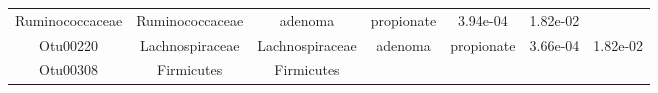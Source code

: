 \documentclass[11pt,]{article}
\begin{document}
\begin{longtable}[]{@{}ccccccc@{}}
\begin{minipage}[t]{0.17\columnwidth}
Ruminococcaceae\strut
\end{minipage} & \begin{minipage}[t]{0.17\columnwidth}\centering\strut
Ruminococcaceae\strut
\end{minipage} & \begin{minipage}[t]{0.09\columnwidth}\centering\strut
adenoma\strut
\end{minipage} & \begin{minipage}[t]{0.11\columnwidth}\centering\strut
propionate\strut
\end{minipage} & \begin{minipage}[t]{0.09\columnwidth}\centering\strut
3.94e-04\strut
\end{minipage} & \begin{minipage}[t]{0.09\columnwidth}\centering\strut
1.82e-02\strut
\end{minipage}\tabularnewline
\begin{minipage}[t]{0.09\columnwidth}\centering\strut
Otu00220\strut
\end{minipage} & \begin{minipage}[t]{0.17\columnwidth}\centering\strut
Lachnospiraceae\strut
\end{minipage} & \begin{minipage}[t]{0.17\columnwidth}\centering\strut
Lachnospiraceae\strut
\end{minipage} & \begin{minipage}[t]{0.09\columnwidth}\centering\strut
adenoma\strut
\end{minipage} & \begin{minipage}[t]{0.11\columnwidth}\centering\strut
propionate\strut
\end{minipage} & \begin{minipage}[t]{0.09\columnwidth}\centering\strut
3.66e-04\strut
\end{minipage} & \begin{minipage}[t]{0.09\columnwidth}\centering\strut
1.82e-02\strut
\end{minipage}\tabularnewline
\begin{minipage}[t]{0.09\columnwidth}\centering\strut
Otu00308\strut
\end{minipage} & \begin{minipage}[t]{0.17\columnwidth}\centering\strut
Firmicutes\strut
\end{minipage} & \begin{minipage}[t]{0.17\columnwidth}\centering\strut
Firmicutes\strut
\end{minipage} & \begin{minipage}[t]{0.09\columnwidth}\centering\strut

\end{minipage}
\end{longtable}
\end{document}
